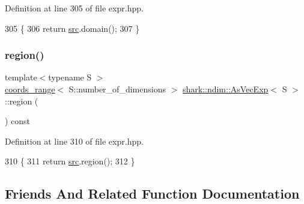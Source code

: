Definition at line 305 of file expr.\+hpp.


\begin{DoxyCode}
305                                                                               \{
306             \textcolor{keywordflow}{return} \hyperlink{classshark_1_1ndim_1_1_as_vec_exp_3_01_s_01_4_aa80febebc38b07290aac9a41c7762252}{src}.domain();
307         \}
\end{DoxyCode}
\hypertarget{classshark_1_1ndim_1_1_as_vec_exp_3_01_s_01_4_a4bd07e8162063ac80052ded4bd3f24fe}{}\label{classshark_1_1ndim_1_1_as_vec_exp_3_01_s_01_4_a4bd07e8162063ac80052ded4bd3f24fe} 
\subsubsection{\texorpdfstring{region()}{region()}}
{\footnotesize\ttfamily template$<$typename S $>$ \\
\hyperlink{structshark_1_1ndim_1_1coords__range}{coords\+\_\+range}$<$ S\+::number\+\_\+of\+\_\+dimensions $>$ \hyperlink{classshark_1_1ndim_1_1_as_vec_exp}{shark\+::ndim\+::\+As\+Vec\+Exp}$<$ S $>$\+::region (\begin{DoxyParamCaption}{ }\end{DoxyParamCaption}) const\hspace{0.3cm}{\ttfamily [inline]}}



Definition at line 310 of file expr.\+hpp.


\begin{DoxyCode}
310                                                                              \{
311             \textcolor{keywordflow}{return} \hyperlink{classshark_1_1ndim_1_1_as_vec_exp_3_01_s_01_4_aa80febebc38b07290aac9a41c7762252}{src}.region();
312         \}
\end{DoxyCode}


\subsection{Friends And Related Function Documentation}
\hypertarget{classshark_1_1ndim_1_1_as_vec_exp_3_01_s_01_4_ac0cbf4be86ef144f231f64fc297e025f}{}\label{classshark_1_1ndim_1_1_as_vec_exp_3_01_s_01_4_ac0cbf4be86ef144f231f64fc297e025f} 
